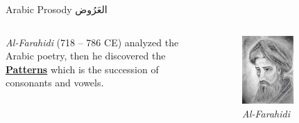 \begin{frame}[fragile]{Arabic Prosody \textarabic{العَرُوض}}
\begin{columns}
\begin{column}{0.4\textwidth}
	\textit{Al-Farahidi} (718 – 786 CE) analyzed the Arabic poetry, then he discovered the \alert{\underline{\textbf{Patterns}}} which is the succession of consonants and vowels.
\end{column}
\begin{column}{0.4\textwidth}
		\begin{figure}
			\begin{center}
				\includegraphics[width=0.6\textwidth]{Figures/Al-Farahidi.jpg}
				\caption{\textit{Al-Farahidi}~\cite{al-farahidi}}
			\end{center}
		\end{figure}
\end{column}
\end{columns}
\end{frame}

